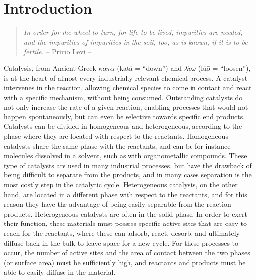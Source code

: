 \graphicspath{{figures/chapter1/}}
\renewcommand\evenpagerightmark{{\scshape\small Introduction}}
\renewcommand\oddpageleftmark{{\scshape\small Chapter 1}}


\hyphenation{}

\chapter[Introduction]%
{Introduction}
\label{ch1}

\begin{flushright}
\begin{quotation}
\textit{In order for the wheel to turn, for life to be lived, impurities are needed, and the impurities of impurities in the soil, too, as is known, if it is to be fertile.} -- Primo Levi --
\end{quotation}
\end{flushright}
\npar
Catalysis, from Ancient Greek $\kappa\alpha\tau\acute{\alpha}$ (kat\'a = ``down'') and $\lambda\acute{\upsilon}\omega$ (l\'u\=o = ``loosen''), is at the heart of almost every industrially relevant chemical process. A catalyst intervenes in the reaction, allowing chemical species to come in contact and react with a specific mechanism, without being consumed. 
Outstanding catalysts do not only increase the rate of a given reaction, enabling processes that would not happen spontaneously, but can even be selective towards specific end products. Catalysts can be divided in homogeneous and heterogeneous, according to the phase where they are located with respect to the reactants. Homogeneous catalysts share the same phase with the reactants, and can be for instance molecules dissolved in a solvent, such as with organometallic compounds. These type of catalysts are used in many industrial processes, but have the drawback of being difficult to separate from the products, and in many cases separation is the most costly step in the catalytic cycle.
\npar
Heterogeneous catalysts, on the other hand, are located in a different phase with respect to the reactants, and for this reason they have the advantage of being easily separable from the reaction products. Heterogeneous catalysts are often in the solid phase. In order to exert their function, these materials must possess specific active sites that are easy to reach for the reactants, where these can adsorb, react, desorb, and ultimately diffuse back in the bulk to leave space for a new cycle. For these processes to occur, the number of active sites and the area of contact between the two phases (or surface area) must be sufficiently high, and reactants and products must be able to easily diffuse in the material. 
